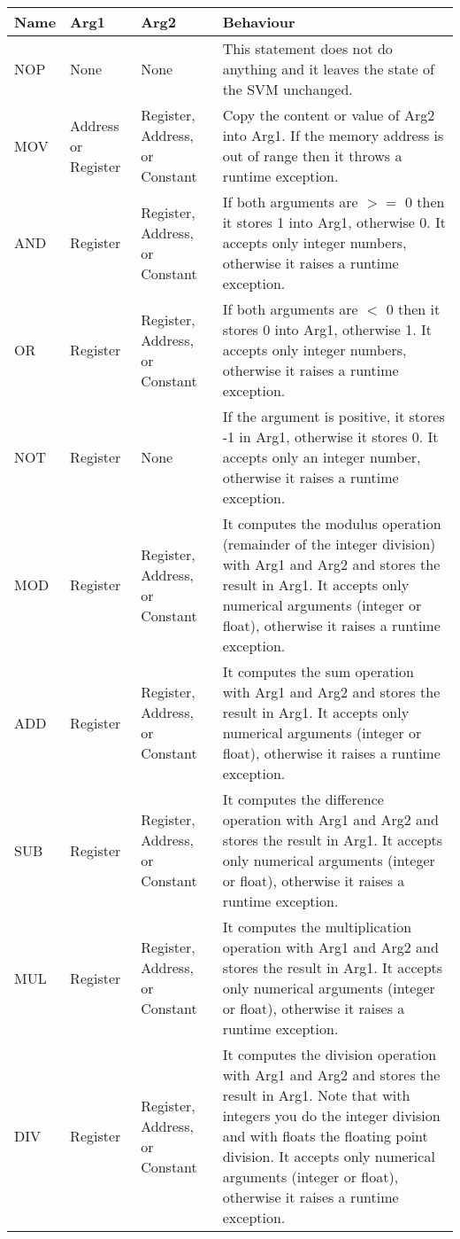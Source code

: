 \begin{longtable}{|p{1cm}|p{2cm}|p{2cm}|p{5cm}|}
	\hline
	\textbf{Name} & \textbf{Arg1} & \textbf{Arg2} & \textbf{Behaviour} \\
	\hline
	NOP & None & None & This statement does not do anything and it leaves the state of the SVM unchanged. \\
	\hline
	MOV & Address or Register & Register, Address, or Constant & Copy the content or value of Arg2 into Arg1. If the memory address is out of range then it throws a runtime exception. \\
	\hline
	AND & Register & Register, Address, or Constant & If both arguments are $>=$ 0 then it stores 1 into Arg1, otherwise 0. It accepts only integer numbers, otherwise it raises a runtime exception. \\
	\hline
	OR & Register & Register, Address, or Constant & If both arguments are $<$ 0 then it stores 0 into Arg1, otherwise 1. It accepts only integer numbers, otherwise it raises a runtime exception. \\
	\hline
	NOT & Register & None & If the argument is positive, it stores -1 in Arg1, otherwise it stores 0. It accepts only an integer number, otherwise it raises a runtime exception. \\
	\hline
	MOD & Register & Register, Address, or Constant & It computes the modulus operation (remainder of the integer division) with Arg1 and Arg2 and stores the result in Arg1. It accepts only numerical arguments (integer or float), otherwise it raises a runtime exception. \\
	\hline
	ADD & Register & Register, Address, or Constant & It computes the sum operation with Arg1 and Arg2 and stores the result in Arg1. It accepts only numerical arguments (integer or float), otherwise it raises a runtime exception. \\
	\hline
	SUB & Register & Register, Address, or Constant & It computes the difference operation with Arg1 and Arg2 and stores the result in Arg1. It accepts only numerical arguments (integer or float), otherwise it raises a runtime exception. \\
	\hline
	MUL & Register & Register, Address, or Constant & It computes the multiplication operation with Arg1 and Arg2 and stores the result in Arg1. It accepts only numerical arguments (integer or float), otherwise it raises a runtime exception. \\
	\hline
	DIV & Register & Register, Address, or Constant & It computes the division operation with Arg1 and Arg2 and stores the result in Arg1. Note that with integers you do the integer division and with floats the floating point division. It accepts only numerical arguments (integer or float), otherwise it raises a runtime exception. \\

\end{longtable}
